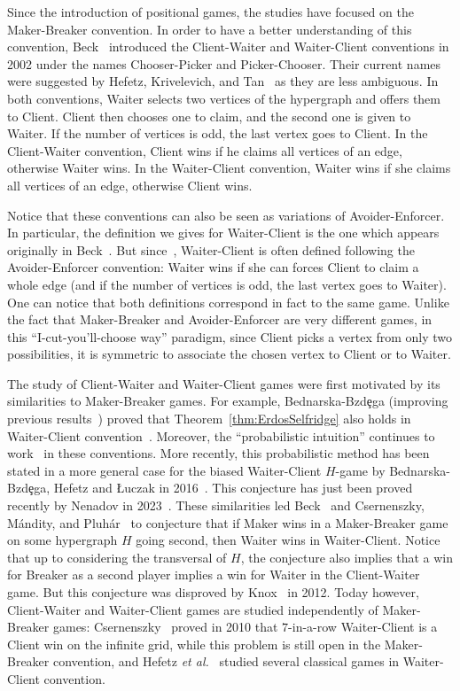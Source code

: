 \documentclass{article}
\newcommand{\etal}{{\em et al.}\xspace}
\newcommand{\hedge}{edge\xspace}
\begin{document}
Since the introduction of positional games, the studies have focused on the Maker-Breaker convention. In order to have a better understanding of this convention, Beck~\cite{Bec02} introduced the Client-Waiter and Waiter-Client conventions in 2002 under the names Chooser-Picker and Picker-Chooser. Their current names were suggested by Hefetz, Krivelevich, and Tan~\cite{HKT16} as they are less ambiguous. In both conventions, Waiter selects two vertices of the hypergraph and offers them to Client. Client then chooses one to claim, and the second one is given to Waiter. If the number of vertices is odd, the last vertex goes to Client. In the Client-Waiter convention, Client wins if he claims all vertices of an \hedge, otherwise Waiter wins. In the Waiter-Client convention, Waiter wins if she claims all vertices of an \hedge, otherwise Client wins. 

Notice that these conventions can also be seen as variations of  Avoider-Enforcer. In particular, the definition we gives for Waiter-Client is the one which appears originally in Beck~\cite{Bec02}. But since~\cite{HKT16}, Waiter-Client is often defined following the Avoider-Enforcer convention: Waiter wins if she can forces Client to claim a whole edge (and if the number of vertices is odd, the last vertex goes to Waiter). One can notice that both definitions correspond in fact to the same game. Unlike the fact that Maker-Breaker and Avoider-Enforcer are very different games, in this ``I-cut-you’ll-choose way'' paradigm, since Client picks a vertex from only two possibilities, it is symmetric to associate the chosen vertex to Client or to Waiter.

The study of Client-Waiter and Waiter-Client games were first motivated by its similarities to Maker-Breaker games. 
For example, Bednarska-Bzd\c{e}ga (improving previous results~\cite{Bec02,CMP09}) proved that Theorem~\ref{thm:ErdosSelfridge} also holds in Waiter-Client convention~\cite{Bed13}. Moreover, the ``probabilistic intuition'' continues to work~\cite{Bec02} in these conventions. More recently, this probabilistic method has been stated in a more general case for the biased Waiter-Client $H$-game by Bednarska-Bzd\c ega, Hefetz and \L{}uczak in 2016~\cite{Bed16}. This conjecture has just been proved recently by Nenadov in 2023~\cite{Nen23}. These similarities led Beck~\cite{Bec02} and Csernenszky, Mándity, and Pluhár~\cite{CMP09} to conjecture that if Maker wins in a Maker-Breaker game on some hypergraph $H$ going second, then Waiter wins in Waiter-Client. Notice that up to considering the transversal of \(H\), the conjecture also implies that a win for Breaker as a second player implies a win for Waiter in the Client-Waiter game. But this conjecture was disproved by Knox~\cite{Kno12} in 2012. Today however, Client-Waiter and Waiter-Client games are studied independently of Maker-Breaker games: Csernenszky~\cite{Cse10} proved in 2010 that $7$-in-a-row Waiter-Client is a Client win on the infinite grid, while this problem is still open in the Maker-Breaker convention, and Hefetz \etal~\cite{HKT16} studied several classical games in Waiter-Client convention.
\end{document}
